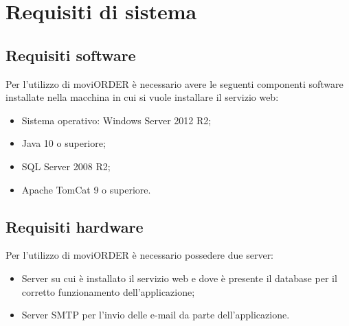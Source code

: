 \section{Requisiti di sistema} \label{requisiti}

	\subsection{Requisiti software}
		
		Per l'utilizzo di moviORDER è necessario avere le seguenti componenti software installate 
		nella macchina in cui si vuole installare il servizio web:	
			
		\begin{itemize}
			\item Sistema operativo: Windows Server 2012 R2;
			\item Java 10 o superiore;
			\item SQL Server 2008 R2;
			\item Apache TomCat 9 o superiore.
		\end{itemize}
		
	\subsection{Requisiti hardware}
		Per l'utilizzo di moviORDER è necessario possedere due server:
		\begin{itemize}
			\item Server su cui è installato il servizio web e dove è presente il database per il corretto funzionamento dell'applicazione;
			\item Server SMTP per l'invio delle e-mail da parte dell'applicazione.
		\end{itemize}